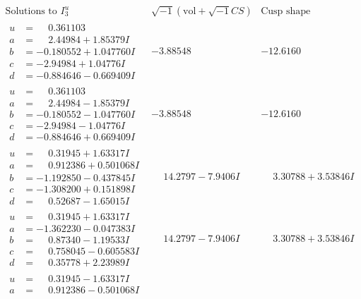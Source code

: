 \documentclass[1p]{elsarticle_modified}
\theoremstyle{definition}
\newcommand{\I}{\sqrt{-1}}
\begin{document}
$$\begin{array}{c|c|c}  
\text{Solutions to }I^u_{3}& \I (\text{vol} + \sqrt{-1}CS) & \text{Cusp shape}\\
 \hline 
\begin{aligned}
u &= \phantom{-}0.361103\phantom{ +0.000000I} \\
a &= \phantom{-}2.44984 + 1.85379 I \\
b &= -0.180552 + 1.047760 I \\
c &= -2.94984 + 1.04776 I \\
d &= -0.884646 - 0.669409 I\end{aligned}
 & -3.88548\phantom{ +0.000000I} & -12.6160\phantom{ +0.000000I} \\ \hline\begin{aligned}
u &= \phantom{-}0.361103\phantom{ +0.000000I} \\
a &= \phantom{-}2.44984 - 1.85379 I \\
b &= -0.180552 - 1.047760 I \\
c &= -2.94984 - 1.04776 I \\
d &= -0.884646 + 0.669409 I\end{aligned}
 & -3.88548\phantom{ +0.000000I} & -12.6160\phantom{ +0.000000I} \\ \hline\begin{aligned}
u &= \phantom{-}0.31945 + 1.63317 I \\
a &= \phantom{-}0.912386 + 0.501068 I \\
b &= -1.192850 - 0.437845 I \\
c &= -1.308200 + 0.151898 I \\
d &= \phantom{-}0.52687 - 1.65015 I\end{aligned}
 & \phantom{-}14.2797 - 7.9406 I & \phantom{-}3.30788 + 3.53846 I \\ \hline\begin{aligned}
u &= \phantom{-}0.31945 + 1.63317 I \\
a &= -1.362230 - 0.047383 I \\
b &= \phantom{-}0.87340 - 1.19533 I \\
c &= \phantom{-}0.758045 - 0.605583 I \\
d &= \phantom{-}0.35778 + 2.23989 I\end{aligned}
 & \phantom{-}14.2797 - 7.9406 I & \phantom{-}3.30788 + 3.53846 I \\ \hline\begin{aligned}
u &= \phantom{-}0.31945 - 1.63317 I \\
a &= \phantom{-}0.912386 - 0.501068 I \\

\end{aligned}
\end{array}$$
\end{document}
